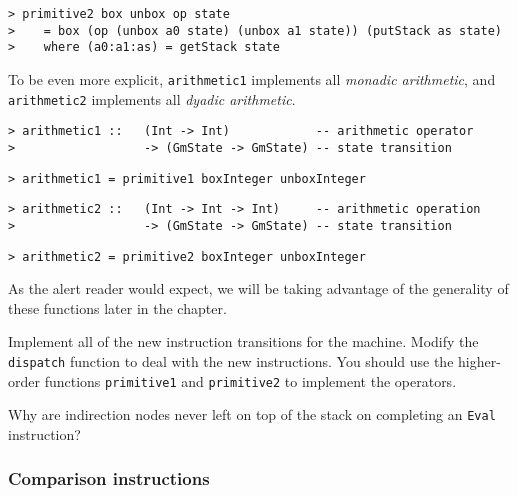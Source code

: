 %
\begin{verbatim}
> primitive2 box unbox op state
>    = box (op (unbox a0 state) (unbox a1 state)) (putStack as state)
>    where (a0:a1:as) = getStack state
\end{verbatim}
%
\par
To be even more explicit, \mbox{\tt arithmetic1} implements all {\em monadic
arithmetic}, and \mbox{\tt arithmetic2}
implements all {\em dyadic arithmetic}.
\begin{verbatim}
> arithmetic1 ::   (Int -> Int)            -- arithmetic operator
>                  -> (GmState -> GmState) -- state transition
\end{verbatim}
%
\begin{verbatim}
> arithmetic1 = primitive1 boxInteger unboxInteger
\end{verbatim}
%
\begin{verbatim}
> arithmetic2 ::   (Int -> Int -> Int)     -- arithmetic operation
>                  -> (GmState -> GmState) -- state transition
\end{verbatim}
%
\begin{verbatim}
> arithmetic2 = primitive2 boxInteger unboxInteger
\end{verbatim}
%
As the alert reader would expect, we will be taking advantage of the
generality of these functions later in the chapter.

\begin{exercise}\label{gm:X:step4}
Implement all of the new instruction transitions for the machine.
Modify the \mbox{\tt dispatch} function to deal with the new instructions. You
should use the higher-order functions \mbox{\tt primitive1} and \mbox{\tt primitive2}
to implement the operators.
\end{exercise}

\begin{exercise}\label{gm:X:ind4}
Why are indirection nodes never left on top of the stack on completing
an \mbox{\tt Eval} instruction?
\end{exercise}

\subsubsection{Comparison instructions}

